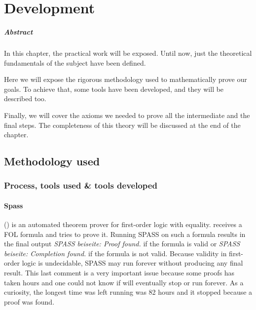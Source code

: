 \chapter{Development\label{sec:develpment}}

\paragraph{Abstract} In this chapter, the practical work will be exposed. Until now, just the theoretical fundamentals of the subject have been defined.

Here we will expose the rigorous methodology used to mathematically prove our goals. To achieve that, some tools have been developed, and they will be described too.

Finally, we will cover the axioms we needed to prove all the intermediate and the final steps. The completeness of this theory will be discussed at the end of the chapter. 

\section{Methodology used}



\subsection{Process, tools used \& tools developed}

\subsubsection{Spass}

\spass () is an automated theorem prover for first-order logic with equality. 
%
\spass receives a \gls{FOL} formula and tries to prove it.
% 
Running SPASS on such a formula results in the final output \textit{SPASS beiseite: Proof found.} if the formula is valid or  \textit{SPASS beiseite: Completion found.} if the formula is not valid.
Because validity in first-order logic is undecidable, SPASS may run forever without producing any final result.
%
This last comment is a very important issue because some proofs has taken hours and one could not know if \spass will eventually stop or run forever.
%
As a curiosity, the longest time \spass was left running was 82 hours and it stopped because a proof was found.


